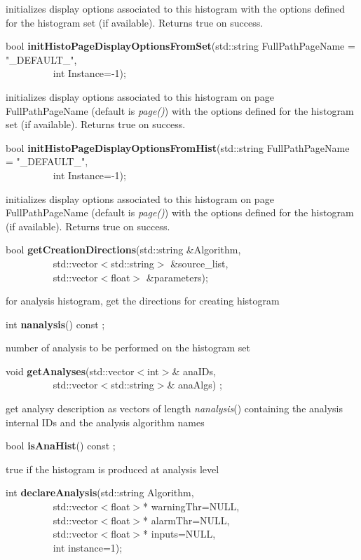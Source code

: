  initializes display options associated to this histogram with the
 options defined for the histogram set (if available). Returns true on
 success.


\item    bool {\bf initHistoPageDisplayOptionsFromSet}(std::string FullPathPageName = "\_DEFAULT\_",\\\mbox{}~~~~~~~~~
					  int Instance=-1);

 initializes display options associated to this histogram on page
 FullPathPageName (default is {\it page()}) with the
 options defined for the histogram set (if available). Returns true on
 success.


\item    bool {\bf initHistoPageDisplayOptionsFromHist}(std::string FullPathPageName = "\_DEFAULT\_",\\\mbox{}~~~~~~~~~
					   int Instance=-1);

 initializes display options associated to this histogram on page
 FullPathPageName (default is {\it page()}) with the
 options defined for the histogram (if available). Returns true on
 success.


\item    bool {\bf getCreationDirections}(std::string \&Algorithm,\\\mbox{}~~~~~~~~~
			     std::vector$<$std::string$>$ \&source\_list,\\\mbox{}~~~~~~~~~
			     std::vector$<$float$>$ \&parameters);

 for analysis histogram, get the directions for creating histogram


\item    int {\bf nanalysis}() const ;

 number of analysis to be performed on the histogram set


\item    void {\bf getAnalyses}(std::vector$<$int$>$\& anaIDs,\\\mbox{}~~~~~~~~~
		   std::vector$<$std::string$>$\& anaAlgs) ;

 get analysy description as vectors of length {\it  nanalysis}() containing 
 the analysis internal IDs and the analysis algorithm names


\item    bool {\bf isAnaHist}() const ;

 true if the histogram is produced at analysis level


\item    int {\bf declareAnalysis}(std::string Algorithm,\\\mbox{}~~~~~~~~~ 
                      std::vector$<$float$>$* warningThr=NULL,\\\mbox{}~~~~~~~~~ 
                      std::vector$<$float$>$* alarmThr=NULL,\\\mbox{}~~~~~~~~~ 
                      std::vector$<$float$>$* inputs=NULL,\\\mbox{}~~~~~~~~~ 
                      int instance=1);

